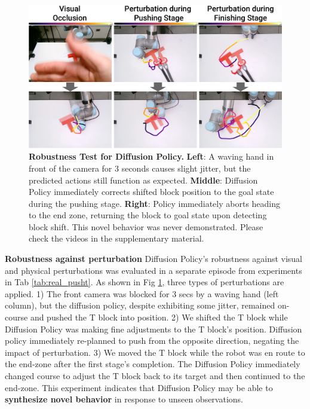 \begin{figure}[t]
\centering
\includegraphics[width=\linewidth]{figure/real_robustness.pdf}

\caption{\textbf{Robustness Test for Diffusion Policy.}
\label{fig:robustness}
\textbf{Left}: A waving hand in front of the camera for 3 seconds causes slight jitter, but the predicted actions still function as expected.
\textbf{Middle}: Diffusion Policy immediately corrects shifted block position to the goal state during the pushing stage.
\textbf{Right}: Policy immediately aborts heading to the end zone, returning the block to goal state upon detecting block shift. This novel behavior was never demonstrated.
Please check the videos in the supplementary material. }

\vspace{-4mm}
\end{figure}

\textbf{Robustness against perturbation}
Diffusion Policy's robustness against visual and physical perturbations was evaluated in a separate episode from experiments in Tab \ref{tab:real_pusht}. As shown in Fig \ref{fig:robustness}, three types of perturbations are applied.
1) The front camera was blocked for 3 secs by a waving hand (left column), but the diffusion policy, despite exhibiting some jitter, remained on-course and pushed the T block into position.
2) We shifted the T block while Diffusion Policy was making fine adjustments to the T block's position. Diffusion policy immediately re-planned to push from the opposite direction, negating the impact of perturbation.
3) We moved the T block while the robot was en route to the end-zone after the first stage's completion. The Diffusion Policy immediately changed course to adjust the T block back to its target and then continued to the end-zone. This experiment indicates that Diffusion Policy may be able to \textbf{synthesize novel behavior} in response to unseen observations.

